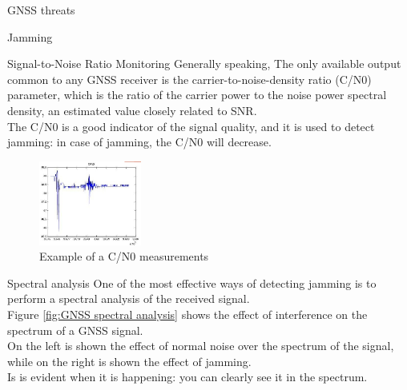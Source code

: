 \begin{section}{GNSS threats}
\begin{subsection}{Jamming}
\begin{subsubsection}{Signal-to-Noise Ratio Monitoring}
          Generally speaking, The only available output common to any GNSS receiver is the 
          carrier-to-noise-density ratio (C/N0) parameter, which is the ratio of the carrier power
          to the noise power spectral density, an estimated value closely related to SNR.\\
          The C/N0 is a good indicator of the signal quality, and it is used to detect jamming: in
          case of jamming, the C/N0 will decrease.\\
          \begin{figure}[h]
            \centering
            \includegraphics[width=0.3\textwidth]{img/wireless/c over n0.png}
            \caption{Example of a C/N0 measurements}
            \label{fig:GNSS CN0 monitoring}
          \end{figure}

        \end{subsubsection}
        \begin{subsubsection}{Spectral analysis}
          One of the most effective ways of detecting jamming is to perform a spectral analysis of the
          received signal.\\

          Figure \ref{fig:GNSS spectral analysis} shows the effect of interference on the spectrum
          of a GNSS signal.\\
          On the left is shown the effect of normal noise over the spectrum of the signal, while on
          the right is shown the effect of jamming.\\
          Is is evident when it is happening: you can clearly see it in the spectrum.\\


\end{subsubsection}
\end{subsection}
\end{section}
